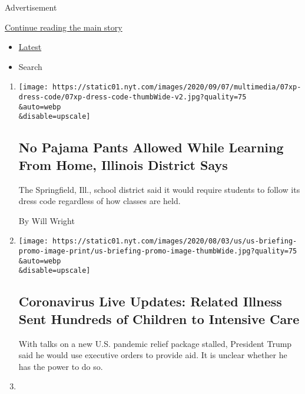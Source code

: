 Advertisement

\protect\hyperlink{after-mid1}{Continue reading the main story}

\begin{itemize}
\tightlist
\item
  \protect\hyperlink{stream-panel}{Latest}
\item
  Search
\end{itemize}

\begin{enumerate}
\def\labelenumi{\arabic{enumi}.}
\item
  \href{/2020/08/08/us/pajamas-school-springfield-dress-code.html}{}

  \texttt{[image: https://static01.nyt.com/images/2020/09/07/multimedia/07xp-dress-code/07xp-dress-code-thumbWide-v2.jpg?quality=75\\\&auto=webp\\\&disable=upscale]}

  \hypertarget{no-pajama-pants-allowed-while-learning-from-home-illinois-district-says}{%
  \subsection{No Pajama Pants Allowed While Learning From Home, Illinois
  District
  Says}\label{no-pajama-pants-allowed-while-learning-from-home-illinois-district-says}}

  The Springfield, Ill., school district said it would require students
  to follow its dress code regardless of how classes are held.

  By Will Wright
\item
  \href{/2020/08/08/world/coronavirus-updates.html}{}

  \texttt{[image: https://static01.nyt.com/images/2020/08/03/us/us-briefing-promo-image-print/us-briefing-promo-image-thumbWide.jpg?quality=75\\\&auto=webp\\\&disable=upscale]}

  \hypertarget{coronavirus-live-updates-related-illness-sent-hundreds-of-children-to-intensive-care}{%
  \subsection{Coronavirus Live Updates: Related Illness Sent Hundreds of
  Children to Intensive
  Care}\label{coronavirus-live-updates-related-illness-sent-hundreds-of-children-to-intensive-care}}

  With talks on a new U.S. pandemic relief package stalled, President
  Trump said he would use executive orders to provide aid. It is unclear
  whether he has the power to do so.
\item
  \href{/2020/08/08/us/politics/trump-russia.html}{}


\end{enumerate}
